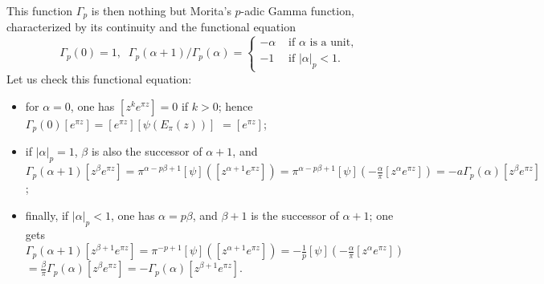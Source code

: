 \begin{para}
 This function $\Gamma_p$ is then nothing but Morita's $p$-adic
 Gamma function, characterized by its continuity and the functional equation
 \begin{equation*}
  \Gamma_p(0)=1, \;\;\Gamma_p(\alpha +1)/\Gamma_p(\alpha) =
   \begin{cases}
    -\alpha & \text{ if $\alpha$ is a unit,}\\
    -1 & \text{ if $|\alpha|_p < 1$.}
   \end{cases}
 \end{equation*}
 Let us check this functional equation:
 \begin{itemize}
  \item for $\alpha = 0$, one has
	$[z^{k}e^{\pi z}]=0$ if $k>0$; hence
	$\Gamma_p(0)[e^{\pi z}]=[e^{\pi z}][\psi(E_{\pi}(z))]$ $=[e^{\pi z}]$;
  \item if $|\alpha|_p=1$,
	$\beta$ is also the successor of $\alpha +1$, and
	$\Gamma_p(\alpha +1)[z^{\beta}e^{\pi z}] = {\pi}^{\alpha - p\beta
	+1}[{\psi}]([z^{\alpha +1}e^{\pi z}])= {\pi}^{\alpha - p\beta
	+1}[{\psi}](-\frac{\alpha}{\pi}[z^{\alpha}e^{\pi
	z}])=-a\Gamma_p(\alpha)[z^{\beta}e^{\pi z}]$;
  \item finally, if $|\alpha|_p<1$, one has
	$\alpha = p\beta$, and $\beta +1$ is the successor of $\alpha
	+1$; one gets $\Gamma_p(\alpha
	+1)[z^{\beta +1}e^{\pi z}] = {\pi}^{-p+1}[{\psi}]([z^{\alpha +1}
	e^{\pi z}]) = 
	-\frac{1}{p}[{\psi}](-\frac{\alpha}{\pi}[z^{\alpha} e^{\pi z}])
	$ $=
	\frac{\beta}{\pi}\Gamma_p(\alpha)[z^{\beta}e^{\pi z}] =
	- \Gamma_p(\alpha)[z^{\beta +1}e^{\pi z}]$.
 \end{itemize}
\end{para} 

